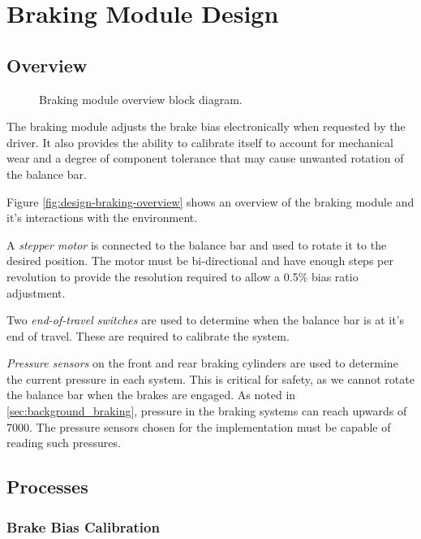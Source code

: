 \section{Braking Module Design\label{sec:Braking-Module-Design}}

\subsection{Overview}

\begin{figure}[H]
\centering

\caption{Braking module overview block diagram.}
\label{fig:pneumatics_design}
\end{figure}

The braking module adjusts the brake bias electronically when requested by the driver. It also provides the ability to calibrate itself to account for mechanical wear and a degree of component tolerance that may cause unwanted rotation of the balance bar.

Figure \ref{fig:design-braking-overview} shows an overview of the braking module and it's interactions with the environment. 

A \emph{stepper motor} is connected to the balance bar and used to rotate it to the desired position. The motor must be bi-directional and have enough steps per revolution to provide the resolution required to allow a 0.5\% bias ratio adjustment.

Two \emph{end-of-travel switches} are used to determine when the balance bar is at it's end of travel. These are required to calibrate the system. 

\emph{Pressure sensors} on the front and rear braking cylinders are used to determine the current pressure in each system. This is critical for safety, as we cannot rotate the balance bar when the brakes are engaged. As noted in \ref{sec:background_braking}, pressure in the braking systems can reach upwards of \unit{7000}{\kilo\pascal}. The pressure sensors chosen for the implementation must be capable of reading such pressures.

\subsection{Processes}

\subsubsection{Brake Bias Calibration}


